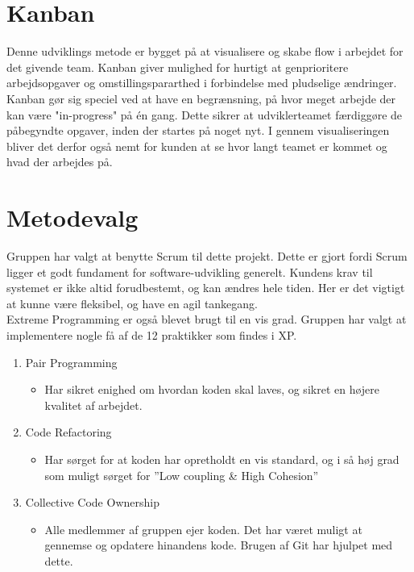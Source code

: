 \section{Kanban}\label{sec:kanban}
Denne udviklings metode er bygget på at visualisere og skabe flow i arbejdet for det givende team. Kanban giver 
mulighed for hurtigt at genprioritere arbejdsopgaver og omstillingspararthed i forbindelse med pludselige ændringer.  \\

Kanban gør sig speciel ved at have en begrænsning, på hvor meget arbejde der kan være "in-progress" på én gang. 
Dette sikrer at udviklerteamet færdiggøre de påbegyndte opgaver, inden der startes på noget nyt. 
I gennem visualiseringen bliver det derfor også nemt for kunden at se hvor langt teamet er kommet og
hvad der arbejdes på.

\section{Metodevalg}\label{sec:valgafvaektoej}
Gruppen har valgt at benytte Scrum til dette projekt. Dette er gjort fordi Scrum ligger et godt fundament 
for software-udvikling generelt. Kundens krav til systemet er ikke altid forudbestemt, og kan ændres hele tiden. 
Her er det vigtigt at kunne være fleksibel, og have en agil tankegang. \\
Extreme Programming er også blevet brugt til en vis grad. Gruppen har valgt at implementere nogle få 
af de 12 praktikker som findes i XP. 
\begin{enumerate}
    \item Pair Programming
    \begin{itemize}
        \item Har sikret enighed om hvordan koden skal laves, og sikret en højere kvalitet af arbejdet.
    \end{itemize}

    \item Code Refactoring
    \begin{itemize}
        \item Har sørget for at koden har opretholdt en vis standard, og i så høj grad som muligt sørget for ”Low coupling \& High Cohesion”
    \end{itemize}
    
    \item Collective Code Ownership
    \begin{itemize}
        \item Alle medlemmer af gruppen ejer koden. Det har været muligt at gennemse og opdatere hinandens kode. 
        Brugen af Git har hjulpet med dette. 
    \end{itemize}
\end{enumerate}

